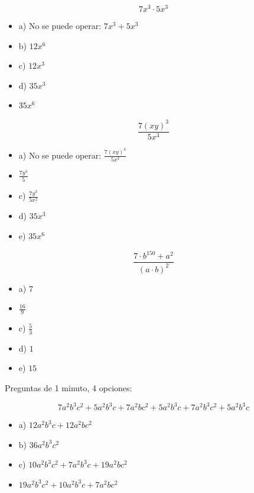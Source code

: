 \[
	7x^3·5x^3
\]

\begin{itemize}
	\item a) No se puede operar: $7x^3+5x^3$
	\item b) $12x^6$
	\item c) $12x^3$
	\item d) $35x^3$
	\item {} $35x^6$
\end{itemize}


\[
	\frac{7(xy)^3}{5x^3}
\]

\begin{itemize}
	\item a) No se puede operar: $\frac{7(xy)^3}{5x^3}$
	\item {} $\frac{7y^3}{5}$
	\item c) $\frac{7y^3}{5x^2}$
	\item d) $35x^3$
	\item e) $35x^6$
\end{itemize}

\[
	\frac{7·b^{150}+a^2}{(a·b)^2}
\]

\begin{itemize}
	\item a) $7$
	\item {} $\frac{16}{9}$
	\item c) $\frac{5}{3}$
	\item d) $1$
	\item e) $15$
\end{itemize}


\newbloq Preguntas de 1 minuto, 4 opciones:

\[
	7a^2b^3c^2 + 5a^2b^3c  + 7a^2bc^2 + 5a^2b^3c + 7a^2b^3c^2 + 5a^2b^3c 
\]

\begin{itemize}
	\item a) $12a^2b^3c + 12a^2bc^2$
	\item b) $36a^2b^3c^2$
	\item c) $10a^2b^3c^2 + 7a^2b^3c + 19a^2bc^2$
	\item {} $19a^2b^3c^2 + 10a^2b^3c + 7a^2bc^2$
\end{itemize}

